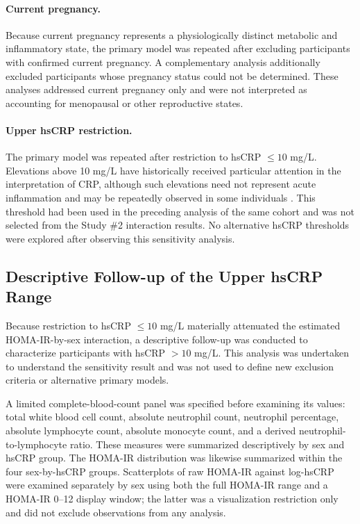 \documentclass[11pt]{article}
\begin{document}
\paragraph{Current pregnancy.}
Because current pregnancy represents a physiologically distinct metabolic and
inflammatory state, the primary model was repeated after excluding participants
with confirmed current pregnancy. A complementary analysis additionally
excluded participants whose pregnancy status could not be determined. These
analyses addressed current pregnancy only and were not interpreted as
accounting for menopausal or other reproductive states.

\paragraph{Upper hsCRP restriction.}
The primary model was repeated after restriction to hsCRP $\leq10$ mg/L.
Elevations above 10 mg/L have historically received particular attention in
the interpretation of CRP, although such elevations need not represent acute
inflammation and may be repeatedly observed in some individuals
\citep{Ishii2012CRP}. This threshold had been used in the preceding analysis
of the same cohort and was not selected from the Study \#2 interaction results.
No alternative hsCRP thresholds were explored after observing this sensitivity
analysis.

\subsection{Descriptive Follow-up of the Upper hsCRP Range}

Because restriction to hsCRP $\leq10$ mg/L materially attenuated the
estimated HOMA-IR-by-sex interaction, a descriptive follow-up was conducted to
characterize participants with hsCRP $>10$ mg/L. This analysis was undertaken
to understand the sensitivity result and was not used to define new exclusion
criteria or alternative primary models.

A limited complete-blood-count panel was specified before examining its values:
total white blood cell count, absolute neutrophil count, neutrophil percentage,
absolute lymphocyte count, absolute monocyte count, and a derived
neutrophil-to-lymphocyte ratio. These measures were summarized descriptively by
sex and hsCRP group. The HOMA-IR distribution was likewise summarized within
the four sex-by-hsCRP groups. Scatterplots of raw HOMA-IR against log-hsCRP
were examined separately by sex using both the full HOMA-IR range and a
HOMA-IR 0--12 display window; the latter was a visualization restriction only
and did not exclude observations from any analysis.
\end{document}
